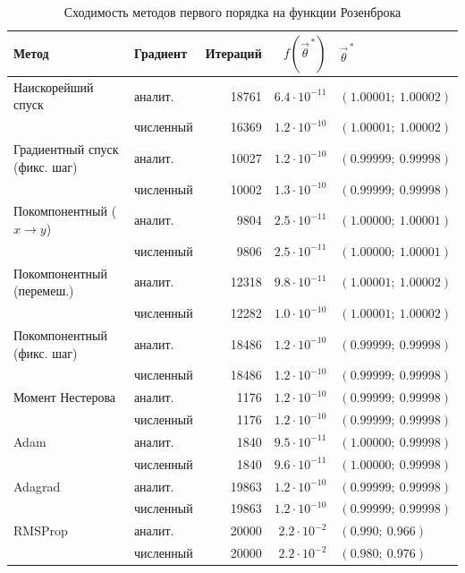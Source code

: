 \documentclass[a4paper]{article}
\begin{document}
\begin{table}[H]
    \centering
    \small
    \caption{Сходимость методов первого порядка на функции Розенброка}
    \label{tab:block1}
    \begin{tabular}{llrrl}
        \toprule
        Метод & Градиент & Итераций & $f(\vec{\theta}^{\,*})$ & $\vec{\theta}^{\,*}$ \\
        \midrule
        Наискорейший спуск & аналит. & 18761 & $6.4\cdot10^{-11}$ & $(1.00001;\ 1.00002)$ \\
                           & численный & 16369 & $1.2\cdot10^{-10}$ & $(1.00001;\ 1.00002)$ \\
        Градиентный спуск (фикс. шаг) & аналит. & 10027 & $1.2\cdot10^{-10}$ & $(0.99999;\ 0.99998)$ \\
                           & численный & 10002 & $1.3\cdot10^{-10}$ & $(0.99999;\ 0.99998)$ \\
        Покомпонентный ($x \to y$) & аналит. & 9804 & $2.5\cdot10^{-11}$ & $(1.00000;\ 1.00001)$ \\
                           & численный & 9806 & $2.5\cdot10^{-11}$ & $(1.00000;\ 1.00001)$ \\
        Покомпонентный (перемеш.) & аналит. & 12318 & $9.8\cdot10^{-11}$ & $(1.00001;\ 1.00002)$ \\
                           & численный & 12282 & $1.0\cdot10^{-10}$ & $(1.00001;\ 1.00002)$ \\
        Покомпонентный (фикс. шаг) & аналит. & 18486 & $1.2\cdot10^{-10}$ & $(0.99999;\ 0.99998)$ \\
                           & численный & 18486 & $1.2\cdot10^{-10}$ & $(0.99999;\ 0.99998)$ \\
        Момент Нестерова & аналит. & 1176 & $1.2\cdot10^{-10}$ & $(0.99999;\ 0.99998)$ \\
                           & численный & 1176 & $1.2\cdot10^{-10}$ & $(0.99999;\ 0.99998)$ \\
        Adam & аналит. & 1840 & $9.5\cdot10^{-11}$ & $(1.00000;\ 0.99998)$ \\
                           & численный & 1840 & $9.6\cdot10^{-11}$ & $(1.00000;\ 0.99998)$ \\
        Adagrad & аналит. & 19863 & $1.2\cdot10^{-10}$ & $(0.99999;\ 0.99998)$ \\
                           & численный & 19863 & $1.2\cdot10^{-10}$ & $(0.99999;\ 0.99998)$ \\
        RMSProp & аналит. & 20000 & $2.2\cdot10^{-2}$ & $(0.990;\ 0.966)$ \\
                           & численный & 20000 & $2.2\cdot10^{-2}$ & $(0.980;\ 0.976)$ \\
        \bottomrule
    \end{tabular}
\end{table}
\end{document}
